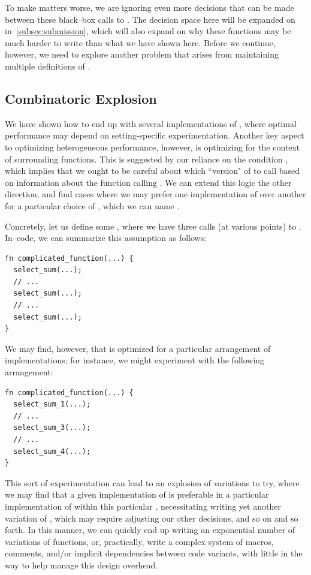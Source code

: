 To make matters worse, we are ignoring even more decisions that can be made between these black--box calls to .  The decision space here will be expanded on in~\ref{subsec:submission}, which will also expand on why these functions may be much harder to write than what we have shown here.  Before we continue, however, we need to explore another problem that arises from maintaining multiple definitions of .

\subsection{Combinatoric Explosion}
\label{subsec:combinatoric}

We have shown how to end up with several implementations of , where optimal performance may depend on setting-specific experimentation.  Another key aspect to optimizing heterogeneous performance, however, is optimizing for the context of surrounding functions.  This is suggested by our reliance on the condition , which implies that we ought to be careful about which ``version" of  to call based on information about the function calling .  We can extend this logic the other direction, and find cases where we may prefer one implementation of  over another for a particular choice of , which we can name .

Concretely, let us define some , where we have three calls (at various points) to .  In--code, we can summarize this assumption as follows:
%
\begin{lstlisting}
fn complicated_function(...) {
  select_sum(...);
  // ...
  select_sum(...);
  // ...
  select_sum(...);
}
\end{lstlisting}
%
We may find, however, that  is optimized for a particular arrangement of  implementations; for instance, we might experiment with the following arrangement:
%
\begin{lstlisting}
fn complicated_function(...) {
  select_sum_1(...);
  // ...
  select_sum_3(...);
  // ...
  select_sum_4(...);
}
\end{lstlisting}
%
This sort of experimentation can lead to an explosion of variations to try, where we may find that a given implementation of  is preferable in a particular implementation of  within this particular , necessitating writing yet another variation of , which may require adjusting our other decisions, and so on and so forth.  In this manner, we can quickly end up writing an exponential number of variations of functions, or, practically, write a complex system of macros, comments, and/or implicit dependencies between code variants, with little in the way to help manage this design overhead.

